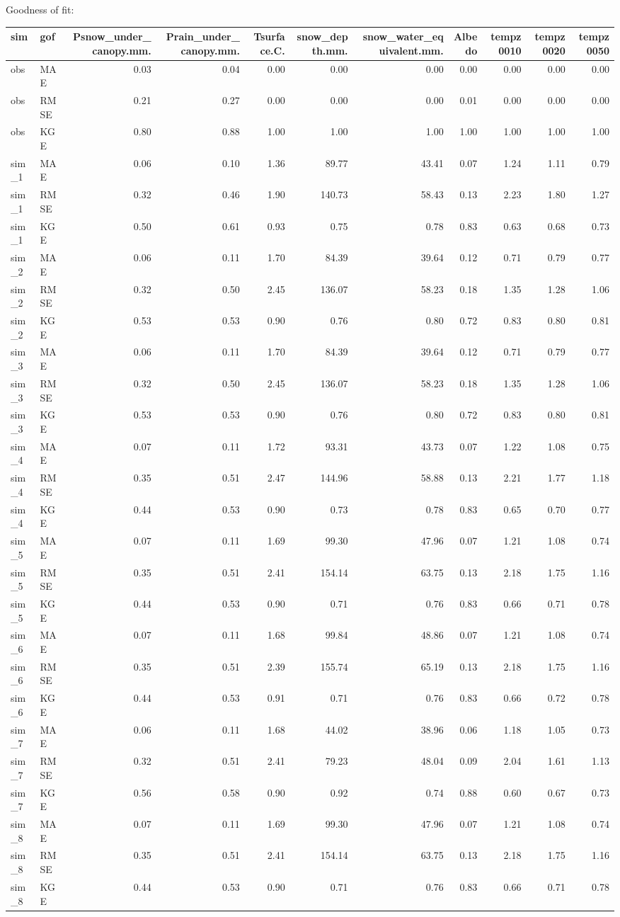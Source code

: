 \documentclass[
]{article}
\begin{document}
Goodness of fit:

\begin{longtable}[]{@{}llrrrrrrrrr@{}}
\toprule
sim & gof & Psnow\_under\_canopy.mm. & Prain\_under\_canopy.mm. &
Tsurface.C. & snow\_depth.mm. & snow\_water\_equivalent.mm. & Albedo &
tempz0010 & tempz0020 & tempz0050\tabularnewline
\midrule
\endhead
obs & MAE & 0.03 & 0.04 & 0.00 & 0.00 & 0.00 & 0.00 & 0.00 & 0.00 &
0.00\tabularnewline
obs & RMSE & 0.21 & 0.27 & 0.00 & 0.00 & 0.00 & 0.01 & 0.00 & 0.00 &
0.00\tabularnewline
obs & KGE & 0.80 & 0.88 & 1.00 & 1.00 & 1.00 & 1.00 & 1.00 & 1.00 &
1.00\tabularnewline
sim\_1 & MAE & 0.06 & 0.10 & 1.36 & 89.77 & 43.41 & 0.07 & 1.24 & 1.11 &
0.79\tabularnewline
sim\_1 & RMSE & 0.32 & 0.46 & 1.90 & 140.73 & 58.43 & 0.13 & 2.23 & 1.80
& 1.27\tabularnewline
sim\_1 & KGE & 0.50 & 0.61 & 0.93 & 0.75 & 0.78 & 0.83 & 0.63 & 0.68 &
0.73\tabularnewline
sim\_2 & MAE & 0.06 & 0.11 & 1.70 & 84.39 & 39.64 & 0.12 & 0.71 & 0.79 &
0.77\tabularnewline
sim\_2 & RMSE & 0.32 & 0.50 & 2.45 & 136.07 & 58.23 & 0.18 & 1.35 & 1.28
& 1.06\tabularnewline
sim\_2 & KGE & 0.53 & 0.53 & 0.90 & 0.76 & 0.80 & 0.72 & 0.83 & 0.80 &
0.81\tabularnewline
sim\_3 & MAE & 0.06 & 0.11 & 1.70 & 84.39 & 39.64 & 0.12 & 0.71 & 0.79 &
0.77\tabularnewline
sim\_3 & RMSE & 0.32 & 0.50 & 2.45 & 136.07 & 58.23 & 0.18 & 1.35 & 1.28
& 1.06\tabularnewline
sim\_3 & KGE & 0.53 & 0.53 & 0.90 & 0.76 & 0.80 & 0.72 & 0.83 & 0.80 &
0.81\tabularnewline
sim\_4 & MAE & 0.07 & 0.11 & 1.72 & 93.31 & 43.73 & 0.07 & 1.22 & 1.08 &
0.75\tabularnewline
sim\_4 & RMSE & 0.35 & 0.51 & 2.47 & 144.96 & 58.88 & 0.13 & 2.21 & 1.77
& 1.18\tabularnewline
sim\_4 & KGE & 0.44 & 0.53 & 0.90 & 0.73 & 0.78 & 0.83 & 0.65 & 0.70 &
0.77\tabularnewline
sim\_5 & MAE & 0.07 & 0.11 & 1.69 & 99.30 & 47.96 & 0.07 & 1.21 & 1.08 &
0.74\tabularnewline
sim\_5 & RMSE & 0.35 & 0.51 & 2.41 & 154.14 & 63.75 & 0.13 & 2.18 & 1.75
& 1.16\tabularnewline
sim\_5 & KGE & 0.44 & 0.53 & 0.90 & 0.71 & 0.76 & 0.83 & 0.66 & 0.71 &
0.78\tabularnewline
sim\_6 & MAE & 0.07 & 0.11 & 1.68 & 99.84 & 48.86 & 0.07 & 1.21 & 1.08 &
0.74\tabularnewline
sim\_6 & RMSE & 0.35 & 0.51 & 2.39 & 155.74 & 65.19 & 0.13 & 2.18 & 1.75
& 1.16\tabularnewline
sim\_6 & KGE & 0.44 & 0.53 & 0.91 & 0.71 & 0.76 & 0.83 & 0.66 & 0.72 &
0.78\tabularnewline
sim\_7 & MAE & 0.06 & 0.11 & 1.68 & 44.02 & 38.96 & 0.06 & 1.18 & 1.05 &
0.73\tabularnewline
sim\_7 & RMSE & 0.32 & 0.51 & 2.41 & 79.23 & 48.04 & 0.09 & 2.04 & 1.61
& 1.13\tabularnewline
sim\_7 & KGE & 0.56 & 0.58 & 0.90 & 0.92 & 0.74 & 0.88 & 0.60 & 0.67 &
0.73\tabularnewline
sim\_8 & MAE & 0.07 & 0.11 & 1.69 & 99.30 & 47.96 & 0.07 & 1.21 & 1.08 &
0.74\tabularnewline
sim\_8 & RMSE & 0.35 & 0.51 & 2.41 & 154.14 & 63.75 & 0.13 & 2.18 & 1.75
& 1.16\tabularnewline
sim\_8 & KGE & 0.44 & 0.53 & 0.90 & 0.71 & 0.76 & 0.83 & 0.66 & 0.71 &
0.78\tabularnewline
\bottomrule
\end{longtable}
\end{document}
